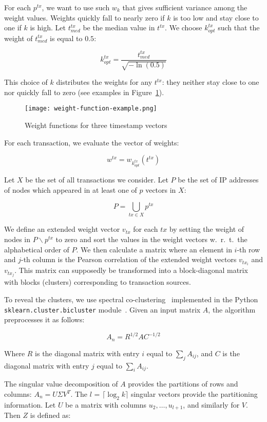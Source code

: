 For each $p^{tx}$, we want to use such $w_k$ that gives sufficient variance among the weight values.
Weights quickly fall to nearly zero if $k$ is too low and stay close to one if $k$ is high.
Let $t^{tx}_{med}$ be the median value in $t^{tx}$.
We choose $k^{tx}_{opt}$ such that the weight of $t^{tx}_{med}$ is equal to $0.5$:

\[
k^{tx}_{opt} = \frac{t^{tx}_{med}}{\sqrt{-\ln(0.5)}}
\]

This choice of $k$ distributes the weights for any $t^{tx}$: they neither stay close to one nor quickly fall to zero (see examples in Figure~\ref{fig:weight}).
\begin{figure}
	\centering
	\texttt{[image: weight-function-example.png]}
	\caption{Weight functions for three timestamp vectors}\label{fig:weight}
\end{figure}
For each transaction, we evaluate the vector of weights:

\[
w^{tx} = w_{k^{tx}_{opt}}(t^{tx})
\]

Let $X$ be the set of all transactions we consider.
Let $P$ be the set of IP addresses of nodes which appeared in at least one of $p$ vectors in $X$:

\[
P = \bigcup\limits_{tx \in X} p^{tx}
\]

We define an extended weight vector $v_{tx}$ for each $tx$ by setting the weight of nodes in $P \backslash p^{tx}$ to zero and sort the values in the weight vectors w.~r.~t.~the alphabetical order of $P$.
We then calculate a matrix where an element in $i$-th row and $j$-th column is the Pearson correlation of the extended weight vectors $v_{tx_i}$ and $v_{tx_j}$.
This matrix can supposedly be transformed into a block-diagonal matrix with blocks (clusters) corresponding to transaction sources.

To reveal the clusters, we use spectral co-clustering~\cite{Dhillon2001} implemented in the Python \texttt{sklearn.cluster.bicluster} module~\cite{scikitlearn2018}.
Given an input matrix $A$, the algorithm preprocesses it as follows:

\[
A_n = R^{1/2}AC^{-1/2}
\]

Where $R$ is the diagonal matrix with entry $i$ equal to $\sum_{j} A_{ij}$, and $C$ is the diagonal matrix with entry $j$ equal to $\sum_{i} A_{ij}$.

The singular value decomposition of $A$ provides the partitions of rows and columns: $A_{n}=U \Sigma V^{T}$.
The $l$ = $\lceil \log_2 k \rceil$ singular vectors provide the partitioning information.
Let $U$ be a matrix with columns $u_2,\dots,u_{l+1}$, and similarly for $V$.
Then $Z$ is defined as:

